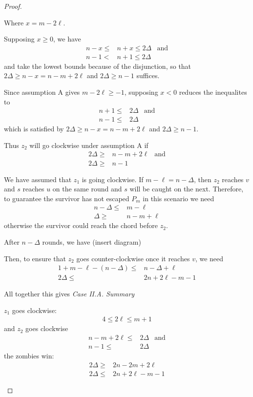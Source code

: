 \begin{proof}
\begin{description}
  Where $x = m -2\ell$.

  Supposing $x\geq 0$, we have
  \begin{align*}
   n-x \leq & n+x \leq 2 \Delta & \text{and} \\
   n-1 < & n+1 \leq 2 \Delta
  \end{align*}
  and take the lowest bounds because of the disjunction, so that
   $2\Delta \geq n-x = n-m+2\ell$ and $2\Delta \geq n-1$ suffices.

  Since assumption A gives $m-2\ell \geq -1$, supposing $x < 0$ reduces the inequalites to
  \begin{align*}
   n+1 \leq & 2 \Delta & \text{and} \\
   n-1 \leq & 2 \Delta
  \end{align*}
  which is satisfied by $2\Delta \geq n-x = n-m+2\ell$ and $2\Delta \geq n-1$.

  Thus $z_2$ will go clockwise under assumption A if
  \begin{align*}
   2\Delta \geq & n-m+2\ell & \text{and} \\
    2\Delta \geq & n-1
  \end{align*}

  We have assumed that $z_1$ is going clockwise. If $m - \ell = n - \Delta$,
  then $z_2$ reaches $v$ and $s$ reaches $u$ on the same round and $s$
  will be caught on the next. Therefore, to guarantee the survivor has not
  escaped $P_m$ in this scenario we need
  \begin{align*}
   n - \Delta \leq & m - \ell     \\
   \Delta \geq     & n - m + \ell
  \end{align*}
  otherwise the survivor could reach the chord before $z_2$.

  After $n-\Delta$ rounds, we have (insert diagram)

  Then, to ensure that $z_2$ goes counter-clockwise once
  it reaches $v$, we need
  \begin{align*}
   1 + m - \ell - (n - \Delta) \leq & n - \Delta + \ell  \\
   2 \Delta \leq                    & 2n + 2\ell - m - 1
  \end{align*}


  All together this gives
  \textit{Case II.A. Summary}

  $z_1$ goes clockwise:
  \begin{align*}
   4 \leq 2 \ell \leq m + 1
  \end{align*}
  and $z_2$ goes clockwise
  \begin{align*}
   n -m + 2\ell \leq & 2 \Delta & \text{and} \\
   n-1 \leq          & 2 \Delta
  \end{align*}
  the zombies win:
  \begin{align*}
   2 \Delta \geq & 2n - 2m + 2\ell    \\
   2 \Delta \leq & 2n + 2\ell - m - 1
  \end{align*}


\end{description}
\end{proof}
